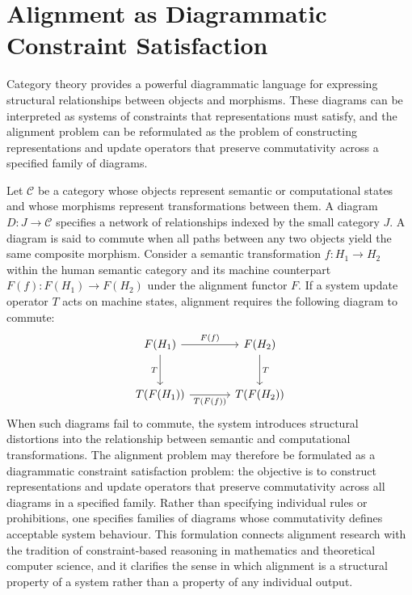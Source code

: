 \documentclass[12pt]{article}
\theoremstyle{definition}
\begin{document}
\section{Alignment as Diagrammatic Constraint Satisfaction}

Category theory provides a powerful diagrammatic language for expressing
structural relationships between objects and morphisms. These diagrams can be
interpreted as systems of constraints that representations must satisfy, and the
alignment problem can be reformulated as the problem of constructing
representations and update operators that preserve commutativity across a
specified family of diagrams.

Let $\mathcal{C}$ be a category whose objects represent semantic or
computational states and whose morphisms represent transformations between them.
A diagram $D : J \to \mathcal{C}$ specifies a network of relationships indexed
by the small category $J$. A diagram is said to commute when all paths between
any two objects yield the same composite morphism. Consider a semantic
transformation $f : H_1 \to H_2$ within the human semantic category and its
machine counterpart $F(f) : F(H_1) \to F(H_2)$ under the alignment functor $F$.
If a system update operator $T$ acts on machine states, alignment requires the
following diagram to commute:
\begin{equation}
\begin{tikzcd}[column sep=large, row sep=large]
F(H_1) \arrow[r,"F(f)"] \arrow[d,"T"']
& F(H_2) \arrow[d,"T"] \\
T(F(H_1)) \arrow[r,"T(F(f))"']
& T(F(H_2))
\end{tikzcd}
\end{equation}
When such diagrams fail to commute, the system introduces structural distortions
into the relationship between semantic and computational transformations. The
alignment problem may therefore be formulated as a diagrammatic constraint
satisfaction problem: the objective is to construct representations and update
operators that preserve commutativity across all diagrams in a specified
family. Rather than specifying individual rules or prohibitions, one specifies
families of diagrams whose commutativity defines acceptable system behaviour.
This formulation connects alignment research with the tradition of
constraint-based reasoning in mathematics and theoretical computer science, and
it clarifies the sense in which alignment is a structural property of a system
rather than a property of any individual output.
\end{document}
